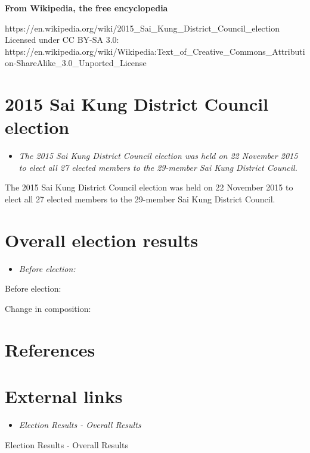 \textbf{From Wikipedia, the free encyclopedia}

https://en.wikipedia.org/wiki/2015\_Sai\_Kung\_District\_Council\_election\\
Licensed under CC BY-SA 3.0:\\
https://en.wikipedia.org/wiki/Wikipedia:Text\_of\_Creative\_Commons\_Attribution-ShareAlike\_3.0\_Unported\_License

\section{2015 Sai Kung District Council
election}\label{sai-kung-district-council-election}

\begin{itemize}
\item
  \emph{The 2015 Sai Kung District Council election was held on 22
  November 2015 to elect all 27 elected members to the 29-member Sai
  Kung District Council.}
\end{itemize}

The 2015 Sai Kung District Council election was held on 22 November 2015
to elect all 27 elected members to the 29-member Sai Kung District
Council.

\section{Overall election results}\label{overall-election-results}

\begin{itemize}
\item
  \emph{Before election:}
\end{itemize}

Before election:

Change in composition:

\section{References}\label{references}

\section{External links}\label{external-links}

\begin{itemize}
\item
  \emph{Election Results - Overall Results}
\end{itemize}

Election Results - Overall Results
